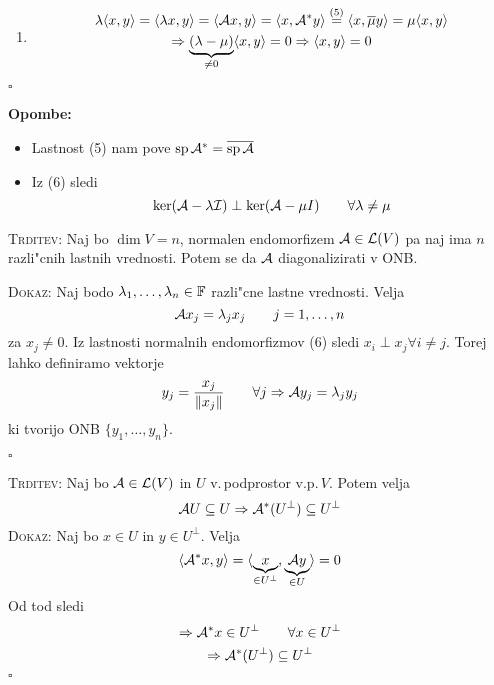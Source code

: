 \begin{enumerate}
    \item
    \begin{gather*}
    \lambda \langle x, y \rangle = \langle \lambda x, y \rangle = \langle \mathcal{A} x, y \rangle = \langle x, \mathcal{A}^* y \rangle \stackrel{(5)}{=} \langle x, \overline{\mu} y \rangle = \mu \langle x, y \rangle \\
    \Rightarrow \underbrace{(\lambda - \mu)}_{\neq 0} \langle x, y \rangle = 0 \Rightarrow \langle x, y \rangle = 0
    \end{gather*}
\end{enumerate}
\hfill $\square$

\textbf{Opombe:}
\begin{itemize}
    \item Lastnost (5) nam pove $\operatorname{sp} \mathcal{A}^* = \overline{\operatorname{sp} \mathcal{A}}$
    \item Iz (6) sledi
    \begin{equation*}
    \ker (\mathcal{A} - \lambda \mathcal{I}) \perp \ker(\mathcal{A} - \mu I) \qquad \forall \lambda \neq \mu
    \end{equation*}
\end{itemize}

\textsc{Trditev:} Naj bo $\dim V = n$, normalen endomorfizem $\mathcal{A}\in \mathcal{L}(V)$ pa naj ima $n$ razli"cnih lastnih vrednosti. Potem se da $\mathcal{A}$ diagonalizirati v ONB.

\textsc{Dokaz:} Naj bodo $\lambda_1, \ldots, \lambda_n \in \operatorname{\mathbb{F}}$ razli"cne lastne vrednosti. Velja
\begin{equation*}
\mathcal{A} x_j = \lambda_j x_j \qquad j = 1, \ldots, n
\end{equation*}
za $x_j \neq 0$. Iz lastnosti normalnih endomorfizmov (6) sledi $x_i \perp x_j \forall i \neq j$. Torej lahko definiramo vektorje
\begin{equation*}
y_j = \dfrac{x_j}{\| x_j \|} \qquad \forall j \Rightarrow \mathcal{A} y_j = \lambda_j y_j
\end{equation*}
ki tvorijo ONB $\{ y_1, \ldots, y_n \}$.

\hfill $\square$

\textsc{Trditev:} Naj bo $\mathcal{A} \in \mathcal{L}(V)$ in $U$ v.\,podprostor v.p.\,$V$. Potem velja
\begin{equation*}
\mathcal{A} U \subseteq U  \Rightarrow \mathcal{A}^* (U^\perp) \subseteq U^\perp
\end{equation*}
\textsc{Dokaz:} Naj bo $x \in U$ in $y \in U^\perp$. Velja
\begin{equation*}
\langle \mathcal{A}^* x, y \rangle = \langle \underbrace{x}_{\in U^\perp}, \underbrace{\mathcal{A} y}_{\in U} \rangle = 0
\end{equation*}
Od tod sledi
\begin{gather*}
\Rightarrow \mathcal{A}^* x \in U^\perp \qquad \forall x \in U^\perp \\
\Rightarrow \mathcal{A}^* (U^\perp) \subseteq U^\perp
\end{gather*}
\hfill $\square$

